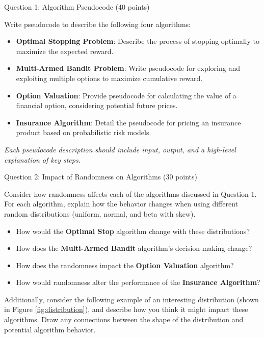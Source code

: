 \documentclass[12pt]{exam}
\begin{document}
\begin{questions}


\question[20] Question 1: Algorithm Pseudocode (40 points)
\addpoints

Write pseudocode to describe the following four algorithms:

\begin{itemize}
    \item \textbf{Optimal Stopping Problem}: Describe the process of stopping optimally to maximize the expected reward.
    \item \textbf{Multi-Armed Bandit Problem}: Write pseudocode for exploring and exploiting multiple options to maximize cumulative reward.
    \item \textbf{Option Valuation}: Provide pseudocode for calculating the value of a financial option, considering potential future prices.
    \item \textbf{Insurance Algorithm}: Detail the pseudocode for pricing an insurance product based on probabilistic risk models.
\end{itemize}

\textit{Each pseudocode description should include input, output, and a high-level explanation of key steps.}



\question[40] Question 2: Impact of Randomness on Algorithms (30 points)

Consider how randomness affects each of the algorithms discussed in Question 1. For each algorithm, explain how the behavior changes when using different random distributions (uniform, normal, and beta with skew).

\begin{itemize}
    \item How would the \textbf{Optimal Stop} algorithm change with these distributions?
    \item How does the \textbf{Multi-Armed Bandit} algorithm's decision-making change?
    \item How does the randomness impact the \textbf{Option Valuation} algorithm?
    \item How would randomness alter the performance of the \textbf{Insurance Algorithm}?
\end{itemize}

Additionally, consider the following example of an interesting distribution (shown in Figure \ref{fig:distribution}), and describe how you think it might impact these algorithms. Draw any connections between the shape of the distribution and potential algorithm behavior.



\end{questions}
\end{document}
